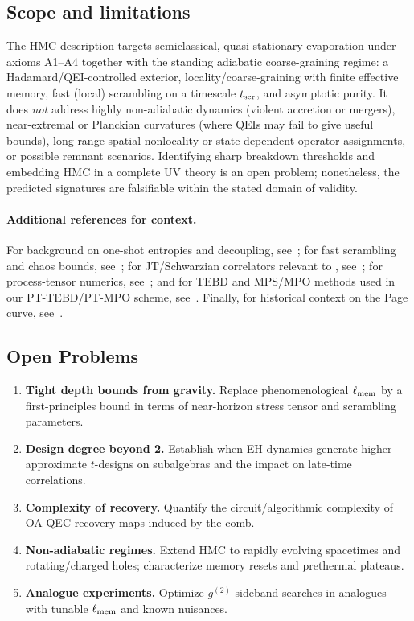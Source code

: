 \documentclass[a4paper,11pt]{article}
\newcommand{\HMC}{\textup{\textsc{HMC}}\xspace}
\theoremstyle{plain}
\theoremstyle{definition}
\theoremstyle{remark}
\begin{document}
\subsection{Scope and limitations}
The \HMC{} description targets semiclassical, quasi-stationary evaporation under axioms A1--A4 together with the standing adiabatic coarse-graining regime: a Hadamard/QEI-controlled exterior, locality/coarse-graining with finite effective memory, fast (local) scrambling on a timescale $t_{\rm scr}$, and asymptotic purity. It does \emph{not} address highly non-adiabatic dynamics (violent accretion or mergers), near-extremal or Planckian curvatures (where QEIs may fail to give useful bounds), long-range spatial nonlocality or state-dependent operator assignments, or possible remnant scenarios. Identifying sharp breakdown thresholds and embedding \HMC{} in a complete UV theory is an open problem; nonetheless, the predicted signatures are falsifiable within the stated domain of validity.

\paragraph{Additional references for context.} For background on one-shot entropies and decoupling, see~\cite{Horodecki:2009}; for fast scrambling and chaos bounds, see~\cite{Sekino:2008,Maldacena:2016}; for JT/Schwarzian correlators relevant to , see~\cite{StanfordWitten:2017}; for process-tensor numerics, see~\cite{Strathearn:2018}; and for TEBD and MPS/MPO methods used in our PT-TEBD/PT-MPO scheme, see~\cite{Vidal:2003,Vidal:2004}. Finally, for historical context on the Page curve, see~\cite{Page:1976}.

\subsection*{Open Problems}
\begin{enumerate}[leftmargin=*]
\item \textbf{Tight depth bounds from gravity.} Replace phenomenological $\ell_{\rm mem}$ by a first-principles bound in terms of near-horizon stress tensor and scrambling parameters.
\item \textbf{Design degree beyond 2.} Establish when EH dynamics generate higher approximate $t$-designs on subalgebras and the impact on late-time correlations.
\item \textbf{Complexity of recovery.} Quantify the circuit/algorithmic complexity of OA-QEC recovery maps induced by the comb.
\item \textbf{Non-adiabatic regimes.} Extend \HMC{} to rapidly evolving spacetimes and rotating/charged holes; characterize memory resets and prethermal plateaus.
\item \textbf{Analogue experiments.} Optimize $g^{(2)}$ sideband searches in analogues with tunable $\ell_{\rm mem}$ and known nuisances.
\end{enumerate}
\end{document}
